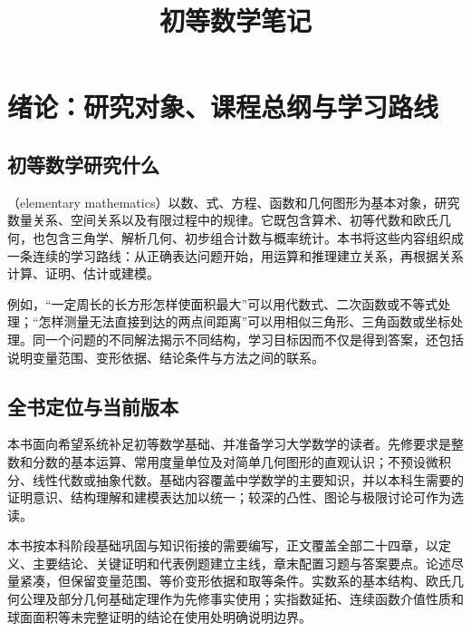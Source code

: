 \documentclass[UTF8]{ctexbook}
\title{初等数学笔记}
\author{}
\date{}
\begin{document}
\maketitle
\tableofcontents

\chapter*{绪论：研究对象、课程总纲与学习路线}

\section*{初等数学研究什么}
（elementary mathematics）以数、式、方程、函数和几何图形为基本对象，研究数量关系、空间关系以及有限过程中的规律。它既包含算术、初等代数和欧氏几何，也包含三角学、解析几何、初步组合计数与概率统计。本书将这些内容组织成一条连续的学习路线：从正确表达问题开始，用运算和推理建立关系，再根据关系计算、证明、估计或建模。

例如，“一定周长的长方形怎样使面积最大”可以用代数式、二次函数或不等式处理；“怎样测量无法直接到达的两点间距离”可以用相似三角形、三角函数或坐标处理。同一个问题的不同解法揭示不同结构，学习目标因而不仅是得到答案，还包括说明变量范围、变形依据、结论条件与方法之间的联系。

\section*{全书定位与当前版本}
本书面向希望系统补足初等数学基础、并准备学习大学数学的读者。先修要求是整数和分数的基本运算、常用度量单位及对简单几何图形的直观认识；不预设微积分、线性代数或抽象代数。基础内容覆盖中学数学的主要知识，并以本科生需要的证明意识、结构理解和建模表达加以统一；较深的凸性、图论与极限讨论可作为选读。

本书按本科阶段基础巩固与知识衔接的需要编写，正文覆盖全部二十四章，以定义、主要结论、关键证明和代表例题建立主线，章末配置习题与答案要点。论述尽量紧凑，但保留变量范围、等价变形依据和取等条件。实数系的基本结构、欧氏几何公理及部分几何基础定理作为先修事实使用；实指数延拓、连续函数介值性质和球面面积等未完整证明的结论在使用处明确说明边界。
\end{document}
